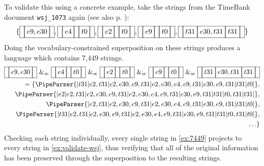 \documentclass[a4paper,12pt,leqno]{article}
\newcommand{\vph}[1]{\vphantom{#1}}
\newcommand{\ebox}[1]{\fbox{$\vph{'(),}#1$}}
\newcommand{\nbBefore}[2]{\ebox{#1}\ebox{}\ebox{#2}}
\newcommand{\nbDuring}[2]{\ebox{#2}\ebox{#1,#2}\ebox{#2}}
\newcommand{\nbEquals}[2]{\ebox{#1,#2}}
\newcommand{\Before}[2]{\ebox{}\nbBefore{#1}{#2}\ebox{}}
\newcommand{\During}[2]{\ebox{}\nbDuring{#1}{#2}\ebox{}}
\newcommand{\Equals}[2]{\ebox{}\nbEquals{#1}{#2}\ebox{}}
\newcommand{\spvc}{~\&_{v\!c}~}
\newcommand{\EventString}[1]{%
	\renewcommand*{\do}[1]{\ebox{##1}}%
	\PipeParser{#1}%
}
\begin{document}
To validate this using a concrete example, take the strings from the TimeBank document \verb|wsj_1073| again (see also p. \pageref{fig:case-study-tlinks}):
\begin{align}
	\{\Equals{e9}{e30}, \Before{e4}{t0}, \Before{e2}{t0}, \Before{e9}{t0}, \During{e30}{t31}\}\label{ex:validate-wsj}
\end{align}
Doing the vocabulary-constrained superposition on these strings produces a language which contains 7,449 strings.
\begin{align}
	\Equals{e9}{e30} \spvc \Before{e4}{t0} \spvc \Before{e2}{t0} \spvc \Before{e9}{t0} \spvc \During{e30}{t31}\\
	= \{ \EventString{{}|t31|e2,t31|e2,e30,e9,t31|e2,e30,e4,e9,t31|e30,e9,t31|t31|t0|{}},\label{ex:7449}\\
	\EventString{{}|e2|e2,t31|e2,e30,e9,t31|e2,e30,e4,e9,t31|e30,e9,t31|t31|t0,t31|t31|{}},\notag\\
	\EventString{{}|e2,t31|e2,e30,e9,t31|e2,e30,e4,e9,t31|e30,e9,t31|t31|t0|{}},\notag\\
	\EventString{{}|t31|e2,t31|e2,e30,e9,t31|e2,e30,e4,e9,t31|e30,e9,t31|t31|t0,t31|t0|{}},\notag\\
	\ldots \}\notag
\end{align}
Checking each string individually, every single string in \cref{ex:7449} projects to every string in \cref{ex:validate-wsj}, thus verifying that all of the original information has been preserved through the superposition to the resulting strings.
\end{document}
